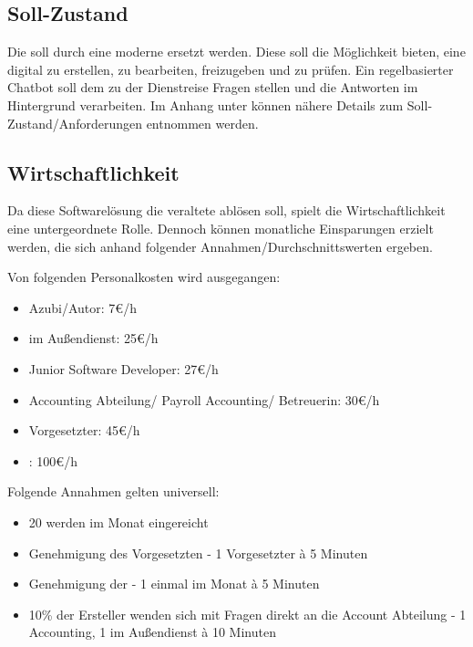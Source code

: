 \subsection{Soll-Zustand}

Die  soll durch eine moderne  ersetzt werden. Diese   soll die Möglichkeit bieten, eine  digital zu erstellen, zu bearbeiten, freizugeben und zu prüfen. Ein regelbasierter Chatbot soll dem  zu der Dienstreise Fragen stellen und die Antworten im Hintergrund verarbeiten. Im Anhang unter  können nähere Details zum Soll-Zustand/Anforderungen entnommen werden.


\subsection{Wirtschaftlichkeit}
Da diese Softwarelösung die veraltete  ablösen soll, spielt die Wirtschaftlichkeit eine untergeordnete Rolle. Dennoch können monatliche Einsparungen erzielt werden, die sich anhand folgender Annahmen/Durchschnittswerten ergeben.

Von folgenden Personalkosten wird ausgegangen:
\begin{itemize}
\item Azubi/Autor: 7€/h
\item {} im Außendienst: 25€/h
\item Junior Software Developer: 27€/h
\item Accounting Abteilung/ Payroll Accounting/ Betreuerin: 30€/h
\item Vorgesetzter: 45€/h
\item {}: 100€/h
\end{itemize}

Folgende Annahmen gelten universell:
\begin{itemize}
\item 20  werden im Monat eingereicht
\item Genehmigung des Vorgesetzten - 1 Vorgesetzter à 5 Minuten
\item Genehmigung der  - 1  einmal im Monat à 5 Minuten
\item 10\% der Ersteller wenden sich mit Fragen direkt an die Account Abteilung - 1  Accounting, 1  im Außendienst à 10 Minuten
\end{itemize}

